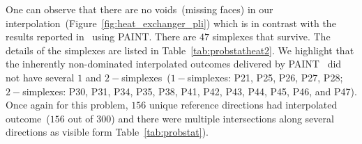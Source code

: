One can observe that there are no voids~(missing faces) in our interpolation~(Figure~\ref{fig:heat_exchanger_pli}) which is in contrast with the results reported in~\cite{hartikainen2010computationally} using PAINT. There are $47$ {\color{blue}simplexes} that survive. The details of the {\color{blue}simplexes} are listed in Table~\ref{tab:probstatheat2}.  We highlight that the inherently non-dominated interpolated outcomes delivered by PAINT~\cite{hartikainen2010computationally} did not have several $1$ and $2-${\color{blue}simplexes}~($1-${\color{blue}simplexes}: P21, P25, P26, P27, P28; $2-${\color{blue}simplexes}: P30, P31, P34, P35, P38, P41, P42, P43, P44, P45, P46, and P47). Once again for this problem, $156$ unique reference directions had interpolated outcome~($156$ out of $300$) and there were multiple intersections along several directions as visible form Table~\ref{tab:probstat}). 


